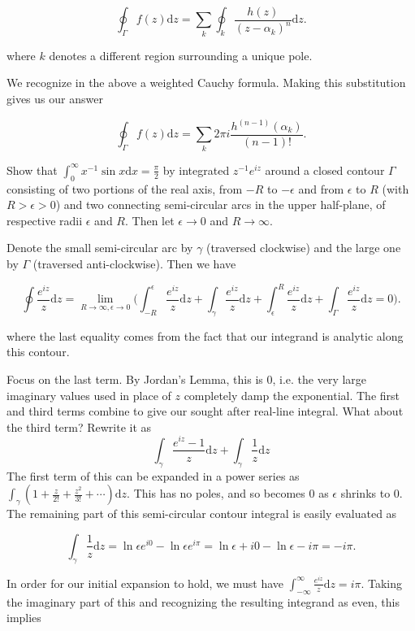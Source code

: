 \documentclass[../the-road-to-reality.tex]{subfiles}
\begin{document}
\begin{questions}
\begin{solution}
	\[
		\oint_\Gamma{f(z)}\mathrm{d}z = \sum_k\oint_k\frac{h(z)}{(z-\alpha_k)^n}\mathrm{d}z
	.\] 	

	where $k$ denotes a different region surrounding a unique pole.

	We recognize in the above a weighted Cauchy formula. Making this substitution gives us our answer

	\[
	\oint_\Gamma{f(z)}\mathrm{d}z = \sum_k2\pi{i}\frac{h^{(n-1)}(\alpha_k)}{(n-1)!}
	.\] 
\end{solution}

\question Show that $\int_0^{\infty}x^{-1}\sin{x}\mathrm{d}x=\frac{\pi}{2}$ by integrated $z^{-1}e^{iz}$ around a closed contour $\Gamma$ consisting of two portions of the real axis, from $-R$ to $-\epsilon$ and from $\epsilon$ to $R$ (with $R>\epsilon>0$) and two connecting semi-circular arcs in the upper half-plane, of respective radii $\epsilon$ and $R$. Then let $\epsilon\to0$ and $R\to\infty$.

\begin{solution}
	Denote the small semi-circular arc by $\gamma$ (traversed clockwise) and the large one by $\Gamma$ (traversed anti-clockwise). Then we have
	
	\[
		\oint\frac{e^{iz}}{z}\mathrm{d}z = \lim_{R\to\infty,\epsilon\to{0}}\Big(\int_{-R}^{\epsilon}\frac{e^{iz}}{z}\mathrm{d}z + \int_\gamma\frac{e^{iz}}{z}\mathrm{d}z + \int_\epsilon^{R}\frac{e^{iz}}{z}\mathrm{d}z + \int_\Gamma\frac{e^{iz}}{z}\mathrm{d}z = 0\Big)
	.\] 	

	where the last equality comes from the fact that our integrand is analytic along this contour.

	Focus on the last term. By Jordan's Lemma, this is $0$, i.e. the very large imaginary values used in place of $z$ completely damp the exponential. The first and third terms combine to give our sought after real-line integral. What about the third term? Rewrite it as$$\int_\gamma\frac{e^{iz}-1}{z}\mathrm{d}z + \int_\gamma\frac{1}{z}\mathrm{d}z$$The first term of this can be expanded in a power series as $\int_\gamma(1+\frac{z}{2!}+\frac{z^2}{3!}+\cdots)\mathrm{d}z$. This has no poles, and so becomes $0$ as $\epsilon$ shrinks to $0$. The remaining part of this semi-circular contour integral is easily evaluated as 
	
	\[
		\int_\gamma\frac{1}{z}\mathrm{d}z = \ln\epsilon{e}^{i0}-\ln\epsilon{e}^{i\pi} = \ln\epsilon + i0 - \ln\epsilon - i\pi = -i\pi
	.\] 

	In order for our initial expansion to hold, we must have $\int_{-\infty}^{\infty}\frac{e^{iz}}{z}\mathrm{d}z = i\pi$. Taking the imaginary part of this and recognizing the resulting integrand as even, this implies
	

\end{solution}
\end{questions}
\end{document}
